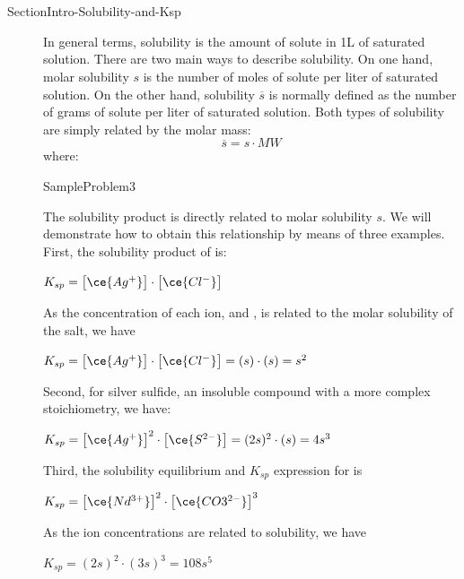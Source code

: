 \documentclass[main.tex]{subfiles}
\newcommand\chapterlabel{Ch-solubility}\setcounter{figurenewcounter}{0}\setcounter{tablenewcounter}{0}\setcounter{formulanewcounter}{0}
\begin{document}
\section{}  {SectionIntro-Solubility-and-Ksp}
\sloppy\begin{description}
\item[] In general terms, solubility is the amount of solute in 1L of saturated solution. There are two main ways to describe solubility. On one hand, molar solubility $s$ is the number of moles of solute per liter of saturated solution. On the other hand, solubility $\overline{s}$ is normally defined as the number of grams of solute per liter of saturated solution. Both types of solubility are simply related by the molar mass:
\begin{equation}
\boxed{ \overline{s}= s\cdot MW  }\label{\chapterlabel:equation1}
\end{equation}
where:


  {SampleProblem3}




\item[] The solubility product is directly related to molar solubility $s$. We will demonstrate how to obtain this relationship by means of three examples.
First, the solubility product of  is:
\begin{center}\hfill $K_{sp}= \big[ \ce{Ag^{+}} \big]\cdot \big[ \ce{Cl^{-}} \big]$\end{center}
As the concentration of each ion,  and , is related to the molar solubility of the salt, we have
\begin{center}$K_{sp}= \big[ \ce{Ag^{+}} \big]\cdot \big[ \ce{Cl^{-}} \big]=(s)\cdot(s)=s^2$\end{center}
Second, for silver sulfide, an insoluble compound with a more complex stoichiometry, we have:
\begin{center}\hfill $K_{sp}= \big[ \ce{Ag^{+}} \big]^2\cdot \big[ \ce{S^{2-}} \big]=(2s)^2\cdot(s)=4s^3 $\end{center}
Third, the solubility equilibrium and $K_{sp}$ expression for  is
\begin{center}\hfill $K_{sp}= \big[ \ce{Nd^{3+}} \big]^2\cdot \big[ \ce{CO3^{2-}} \big]^3$\end{center}
As the ion concentrations are related to solubility, we have
\begin{center}$K_{sp}=(2s)^2\cdot(3s)^3=108s^5 $\end{center}


\end{description}
\end{document}

